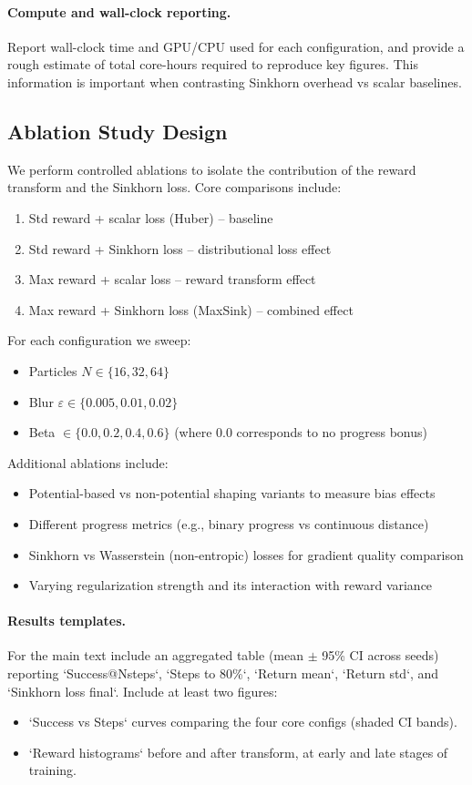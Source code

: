 \documentclass{article}
\begin{document}
\paragraph{Compute and wall-clock reporting.} Report wall-clock time and GPU/CPU used for each configuration, and provide a rough estimate of total core-hours required to reproduce key figures. This information is important when contrasting Sinkhorn overhead vs scalar baselines.

\subsection{Ablation Study Design}
We perform controlled ablations to isolate the contribution of the reward transform and the Sinkhorn loss. Core comparisons include:
\begin{enumerate}
  \item Std reward + scalar loss (Huber) -- baseline
  \item Std reward + Sinkhorn loss -- distributional loss effect
  \item Max reward + scalar loss -- reward transform effect
  \item Max reward + Sinkhorn loss (MaxSink) -- combined effect
\end{enumerate}

For each configuration we sweep:
\begin{itemize}
  \item Particles $N\in\{16,32,64\}$
  \item Blur $\varepsilon\in\{0.005,0.01,0.02\}$
  \item Beta $\in\{0.0,0.2,0.4,0.6\}$ (where 0.0 corresponds to no progress bonus)
\end{itemize}

Additional ablations include:
\begin{itemize}
  \item Potential-based vs non-potential shaping variants to measure bias effects
  \item Different progress metrics (e.g., binary progress vs continuous distance)
  \item Sinkhorn vs Wasserstein (non-entropic) losses for gradient quality comparison
  \item Varying regularization strength and its interaction with reward variance
\end{itemize}

\paragraph{Results templates.} For the main text include an aggregated table (mean $\pm$ 95\% CI across seeds) reporting `Success@Nsteps`, `Steps to 80\%`, `Return mean`, `Return std`, and `Sinkhorn loss final`. Include at least two figures:
\begin{itemize}
  \item `Success vs Steps` curves comparing the four core configs (shaded CI bands).
  \item `Reward histograms` before and after transform, at early and late stages of training.
\end{itemize}
\end{document}
